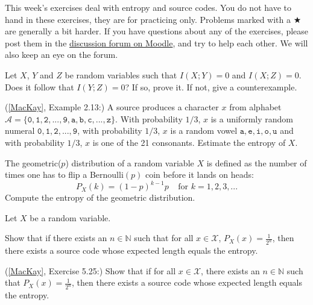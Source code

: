 \documentclass[a4paper,10pt,landscape,twocolumn]{scrartcl}
\begin{document}
\practiceproblems

{\sffamily\noindent
This week's exercises deal with entropy and source codes. You do not have to hand in these exercises, they are for practicing only. Problems marked with a $\bigstar$ are generally a bit harder. If you have questions about any of the exercises, please post them in the \href{https://www.moodle.ch/lms/mod/forum/view.php?id=1761}{discussion forum on Moodle}, and try to help each other. We will also keep an eye on the forum.
}

\begin{exercise}
Let $X$, $Y$ and $Z$ be random variables such that $I(X;Y) = 0$ and $I(X;Z) = 0$. Does it follow that $I(Y;Z) = 0$? If so, prove it. If not, give a counterexample.
\end{exercise}

\begin{exercise}
(\href{http://www.inference.phy.cam.ac.uk/mackay/itila/book.html}{[MacKay]}, Example 2.13:) A source produces a character $x$ from alphabet $\mathcal{A} = \{\mathtt{0, 1, 2, ..., 9, a, b, c, ..., z}\}$. With probability $1/3$, $x$ is a uniformly random numeral $\mathtt{0,1,2,...,9}$, with probability $1/3$, $x$ is a random vowel $\mathtt{a,e,i,o,u}$ and with probability $1/3$, $x$ is one of the 21 consonants. Estimate the entropy of $X$.
\end{exercise}

\begin{exercise}
The geometric($p$) distribution of a random variable $X$ is defined as the number of times one has to flip a Bernoulli$(p)$ coin before it lands on heads:
\[
P_X(k) = (1-p)^{k-1}p \ \ \ \ \ \mbox{for } k = 1, 2, 3, ...
\]
Compute the entropy of the geometric distribution.
\end{exercise}

\begin{exercise}
Let $X$ be a random variable.
	\begin{subex}
	Show that if there exists an $n \in \mathbb{N}$ such that for all $x \in \mathcal{X}$, $P_X(x) = \frac{1}{2^n}$, then there exists a source code whose expected length equals the entropy.
	\end{subex}
	\begin{subex}
	(\href{http://www.inference.phy.cam.ac.uk/mackay/itila/book.html}{[MacKay]}, Exercise 5.25:) Show that if for all $x \in \mathcal{X}$, there exists an $n \in \mathbb{N}$ such that $P_X(x) = \frac{1}{2^n}$, then there exists a source code whose expected length equals the entropy.
	\end{subex}
\end{exercise}
\end{document}
